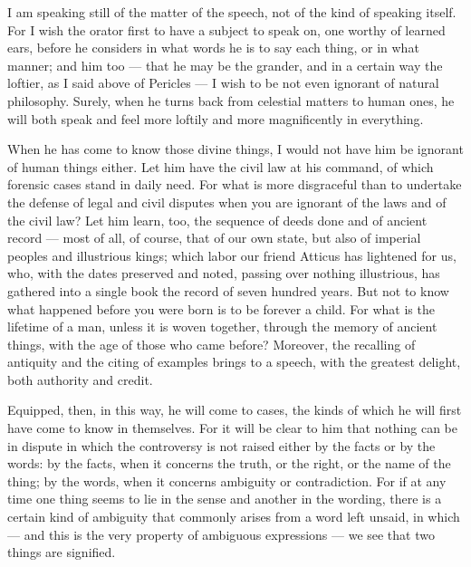 I am speaking still of the matter of the speech, not of the kind of speaking itself. For I wish the orator first to have a subject to speak on, one worthy of learned ears, before he considers in what words he is to say each thing, or in what manner; and him too — that he may be the grander, and in a certain way the loftier, as I said above of Pericles — I wish to be not even ignorant of natural philosophy. Surely, when he turns back from celestial matters to human ones, he will both speak and feel more loftily and more magnificently in everything.

 When he has come to know those divine things, I would not have him be ignorant of human things either. Let him have the civil law at his command, of which forensic cases stand in daily need. For what is more disgraceful than to undertake the defense of legal and civil disputes when you are ignorant of the laws and of the civil law? Let him learn, too, the sequence of deeds done and of ancient record — most of all, of course, that of our own state, but also of imperial peoples and illustrious kings; which labor our friend Atticus has lightened for us, who, with the dates preserved and noted, passing over nothing illustrious, has gathered into a single book the record of seven hundred years. But not to know what happened before you were born is to be forever a child. For what is the lifetime of a man, unless it is woven together, through the memory of ancient things, with the age of those who came before? Moreover, the recalling of antiquity and the citing of examples brings to a speech, with the greatest delight, both authority and credit.

 Equipped, then, in this way, he will come to cases, the kinds of which he will first have come to know in themselves. For it will be clear to him that nothing can be in dispute in which the controversy is not raised either by the facts or by the words: by the facts, when it concerns the truth, or the right, or the name of the thing; by the words, when it concerns ambiguity or contradiction. For if at any time one thing seems to lie in the sense and another in the wording, there is a certain kind of ambiguity that commonly arises from a word left unsaid, in which — and this is the very property of ambiguous expressions — we see that two things are signified.


